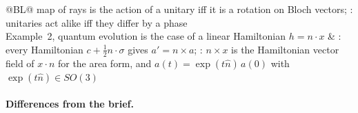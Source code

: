 \documentclass[11pt]{article}
\begin{document}
\begin{center}
\begin{tabularx}{\textwidth}{@{}BL@{}}
  map of rays is the action of a unitary iff it is a rotation on Bloch vectors;
  : unitaries act alike iff they differ by a phase \\
Example~2, quantum evolution is the case of a linear Hamiltonian $h = n\cdot x$ &
  : every Hamiltonian $c + \frac12 n\cdot\sigma$ gives
  $a' = n \times a$; : $n \times x$ is the Hamiltonian vector
  field of $x \cdot n$ for the area form, and $a(t) = \exp(t\hat n)\,a(0)$ with
  $\exp(t\hat n) \in SO(3)$ \\
\bottomrule
\end{tabularx}
\end{center}

\paragraph{Differences from the brief.}
\end{document}
